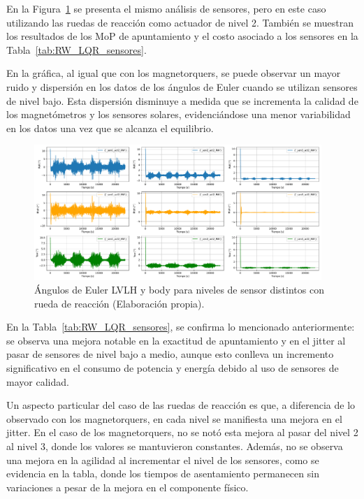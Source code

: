 En la Figura~\ref{fig:RW_LQR_sensores} se presenta el mismo análisis de sensores, pero en este caso utilizando las ruedas de reacción como actuador de nivel 2. También se muestran los resultados de los MoP de apuntamiento y el costo asociado a los sensores en la Tabla~\ref{tab:RW_LQR_sensores}.

En la gráfica, al igual que con los magnetorquers, se puede observar un mayor ruido y dispersión en los datos de los ángulos de Euler cuando se utilizan sensores de nivel bajo. Esta dispersión disminuye a medida que se incrementa la calidad de los magnetómetros y los sensores solares, evidenciándose una menor variabilidad en los datos una vez que se alcanza el equilibrio.

\begin{figure}[H]
	\centering    
	\includegraphics[width=0.97\textwidth]{RW_LQR_sensores.pdf}
	\caption{Ángulos de Euler LVLH y body para niveles de sensor distintos con rueda de reacción (Elaboración propia).}
	\label{fig:RW_LQR_sensores}
\end{figure}

En la Tabla~\ref{tab:RW_LQR_sensores}, se confirma lo mencionado anteriormente: se observa una mejora notable en la exactitud de apuntamiento y en el jitter al pasar de sensores de nivel bajo a medio, aunque esto conlleva un incremento significativo en el consumo de potencia y energía debido al uso de sensores de mayor calidad.

Un aspecto particular del caso de las ruedas de reacción es que, a diferencia de lo observado con los magnetorquers, en cada nivel se manifiesta una mejora en el jitter. En el caso de los magnetorquers, no se notó esta mejora al pasar del nivel 2 al nivel 3, donde los valores se mantuvieron constantes. Además, no se observa una mejora en la agilidad al incrementar el nivel de los sensores, como se evidencia en la tabla, donde los tiempos de asentamiento permanecen sin variaciones a pesar de la mejora en el componente físico.

